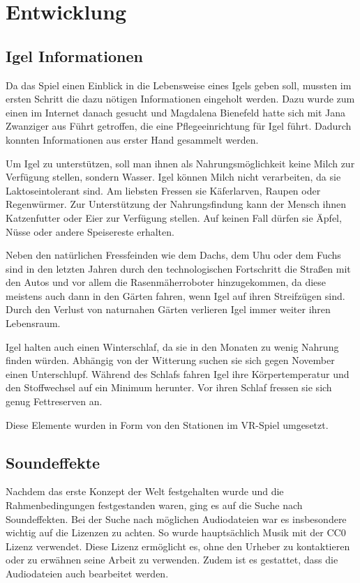 \chapter{Entwicklung}
\section{Igel Informationen}
Da das Spiel einen Einblick in die Lebensweise eines Igels geben soll, mussten im ersten Schritt die dazu nötigen Informationen eingeholt werden. Dazu wurde zum einen im Internet danach gesucht und Magdalena Bienefeld hatte sich mit Jana Zwanziger aus Führt getroffen, die eine Pflegeeinrichtung für Igel führt. Dadurch konnten Informationen aus erster Hand gesammelt werden. \cite{Igelrettung} 

Um Igel zu unterstützen, soll man ihnen als Nahrungsmöglichkeit keine Milch zur Verfügung stellen, sondern Wasser. Igel können Milch nicht verarbeiten, da sie Laktoseintolerant sind. Am liebsten Fressen sie Käferlarven, Raupen oder Regenwürmer. Zur Unterstützung der  Nahrungsfindung kann der Mensch ihnen Katzenfutter oder Eier zur Verfügung stellen. Auf keinen Fall dürfen sie Äpfel, Nüsse oder andere Speisereste erhalten. 

Neben den natürlichen Fressfeinden wie dem Dachs, dem Uhu oder dem Fuchs sind in den letzten Jahren durch den technologischen Fortschritt die Straßen mit den Autos und vor allem die Rasenmäherroboter hinzugekommen, da diese meistens auch dann in den Gärten fahren, wenn Igel auf ihren Streifzügen sind. Durch den Verlust von naturnahen Gärten verlieren Igel immer weiter ihren Lebensraum. 

Igel halten auch einen Winterschlaf, da sie in den Monaten zu wenig Nahrung finden würden. Abhängig von der Witterung suchen sie sich gegen November einen Unterschlupf. Während des Schlafs fahren Igel ihre Körpertemperatur und  den Stoffwechsel auf ein Minimum herunter. Vor ihren Schlaf fressen sie sich genug Fettreserven an. \cite{Igel_Infos_1, Igel_Infos_2}

Diese Elemente wurden in Form von den Stationen im  VR-Spiel umgesetzt.


\section{Soundeffekte}
Nachdem das erste Konzept der Welt festgehalten wurde und die Rahmenbedingungen festgestanden waren, ging es auf die Suche nach Soundeffekten. Bei der Suche nach möglichen Audiodateien war es insbesondere wichtig auf die Lizenzen zu achten. So wurde hauptsächlich Musik mit der CC0 Lizenz verwendet. Diese Lizenz ermöglicht es, ohne den Urheber zu kontaktieren oder zu erwähnen seine Arbeit zu verwenden. Zudem ist es gestattet, dass die Audiodateien auch bearbeitet werden. \cite{CC0_Lizenz, freesound, opengameart} 

